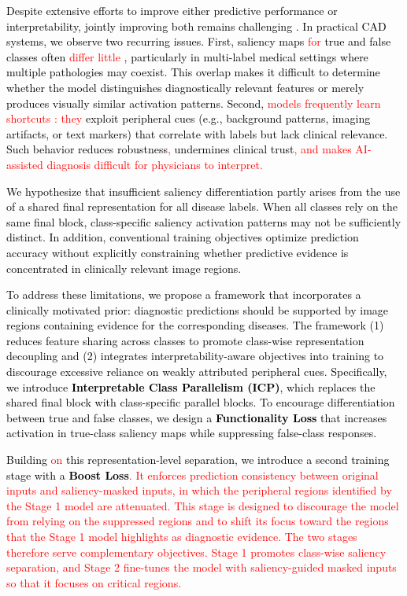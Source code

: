 \documentclass[preprint,7pt, a4paper]{elsarticle}
\begin{document}
\textcolor{black}{Despite extensive efforts to improve either predictive performance or interpretability, jointly improving both remains challenging \cite{57,58,59}. In practical CAD systems, we observe two recurring issues. First, saliency maps \textcolor{red}{for} true and false classes often \textcolor{red}{differ little} \cite{7}, particularly in multi-label medical settings where multiple pathologies may coexist. This overlap makes it difficult to determine whether the model distinguishes diagnostically relevant features or merely produces visually similar activation patterns. Second, \textcolor{red}{models frequently learn shortcuts} \cite{56}\textcolor{red}{: they} exploit peripheral cues (e.g., background patterns, imaging artifacts, or text markers) that correlate with labels but lack clinical relevance. Such behavior reduces robustness\textcolor{red}{,} undermines clinical trust\textcolor{red}{, and makes AI-assisted diagnosis difficult for physicians to interpret.}}

\textcolor{black}{We hypothesize that insufficient saliency differentiation partly arises from the use of a shared final representation for all disease labels. When all classes rely on the same final block, class-specific saliency activation patterns may not be sufficiently distinct. In addition, conventional training objectives optimize prediction accuracy without explicitly constraining whether predictive evidence is concentrated in clinically relevant image regions.}

\textcolor{black}{To address these limitations, we propose a framework that incorporates a clinically motivated prior: diagnostic predictions should be supported by image regions containing evidence for the corresponding diseases. The framework (1) reduces feature sharing across classes to promote class-wise representation decoupling and (2) integrates interpretability-aware objectives into training to discourage excessive reliance on weakly attributed peripheral cues. Specifically, we introduce \textbf{Interpretable Class Parallelism (ICP)}, which replaces the shared final block with class-specific parallel blocks. To encourage differentiation between true and false classes, we design a \textbf{Functionality Loss} that increases activation in true-class saliency maps while suppressing false-class responses.} 

\textcolor{black}{Building \textcolor{red}{on} this representation-level separation, we introduce a second training stage with a \textbf{Boost Loss}\textcolor{red}{. It enforces prediction consistency between original inputs and saliency-masked inputs, in which the peripheral regions identified by the Stage 1 model are attenuated. This stage is designed to discourage the model from relying on the suppressed regions and to shift its focus toward the regions that the Stage 1 model highlights as diagnostic evidence. The two stages therefore serve complementary objectives. Stage 1 promotes class-wise saliency separation, and Stage 2 fine-tunes the model with saliency-guided masked inputs so that it focuses on critical regions.}}
\end{document}
